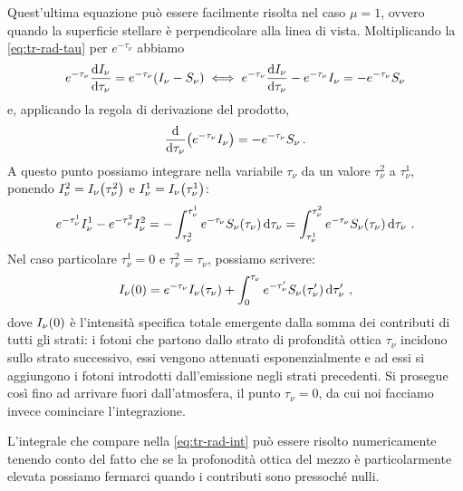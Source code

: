     Quest'ultima equazione può essere facilmente risolta nel caso $\mu = 1$, ovvero quando la superficie stellare è perpendicolare alla linea di vista. Moltiplicando la \eqref{eq:tr-rad-tau} per $e^{-\tau_\nu}$  abbiamo
    \begin{equation*}
        e^{-\tau_\nu} \dv{I_\nu}{\tau_\nu}
        = e^{-\tau_\nu}\pqty{I_{\nu} - S_{\nu}}
        \iff e^{-\tau_\nu} \dv{I_\nu}{\tau_\nu} - e^{-\tau_\nu}I_{\nu}
        = -e^{-\tau_\nu} S_{\nu}
    \end{equation*}
    e, applicando la regola di derivazione del prodotto,
    \begin{equation*}
        \dv{\tau_\nu}\pqty{e^{-\tau_\nu}I_{\nu}} = -e^{-\tau_\nu} S_{\nu}
        \myperiod
    \end{equation*}
    A questo punto possiamo integrare nella variabile $\tau_\nu$ da un valore $\tau_\nu^2$ a $\tau_\nu^1$, ponendo $I_{\nu}^2 = I_{\nu}\pqty{\tau_\nu^2}$ e $I_{\nu}^1 = I_{\nu}\pqty{\tau_\nu^1}$:
    \begin{equation*}
        e^{-\tau_\nu^1}I_{\nu}^1 - e^{-\tau_\nu^2}I_{\nu}^2
        = -\int_{\tau_\nu^2}^{\tau_\nu^1} e^{-\tau_\nu} S_{\nu}\pqty{\tau_\nu} \dd{\tau_\nu}
        = \int_{\tau_\nu^1}^{\tau_\nu^2} e^{-\tau_\nu} S_{\nu}\pqty{\tau_\nu} \dd{\tau_\nu}
        \myperiod
    \end{equation*}
    Nel caso particolare $\tau_\nu^1 = 0$ e $\tau_\nu^2 = \tau_\nu$, possiamo scrivere:
    \begin{equation}
        \label{eq:tr-rad-int}
        I_\nu\pqty{0} = e^{-\tau_\nu}I_{\nu}\pqty{\tau_\nu} + \int_0^{\tau_\nu} e^{-\tau_{\nu}'} S_{\nu}\pqty{\tau_{\nu}'} \dd{\tau_{\nu}'}
        \mycomma
    \end{equation}
    dove $I_\nu\pqty{0}$ è l'intensità specifica totale emergente dalla somma dei contributi di tutti gli strati: i fotoni che partono dallo strato di profondità ottica $\tau_\nu$ incidono sullo strato successivo, essi vengono attenuati esponenzialmente e ad essi si aggiungono i fotoni introdotti dall'emissione negli strati precedenti. Si prosegue così fino ad arrivare fuori dall'atmosfera, il punto $\tau_\nu = 0$, da cui noi facciamo invece cominciare l'integrazione.

    L'integrale che compare nella \eqref{eq:tr-rad-int} può essere risolto numericamente tenendo conto del fatto che se la profonodità ottica del mezzo è particolarmente elevata possiamo fermarci quando i contributi sono pressoché nulli.

